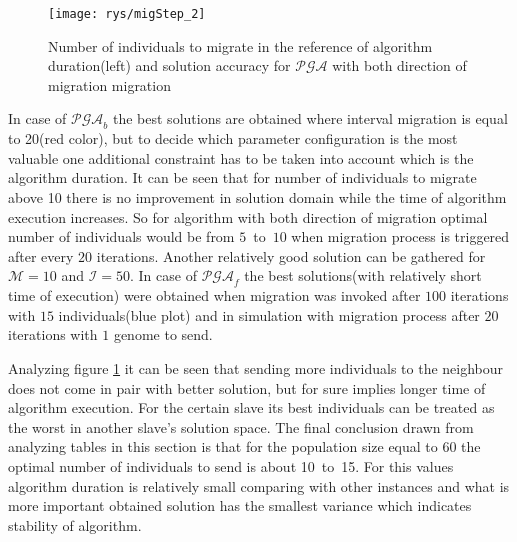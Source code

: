 	\begin{figure}[!htpb]
		\begin{center}
			\texttt{[image: rys/migStep\_2]}
		\end{center}
	\caption{Number of individuals to migrate in the reference of algorithm
	duration(left) and solution
	accuracy for $\mathcal{PGA}$ with both direction of migration migration}
		\label{fig:migNum2}
	\end{figure}

In case of $\mathcal{PGA}_b$ the best solutions
are obtained where interval migration is equal to 20(red color), but to
decide which parameter configuration is the most valuable one additional constraint
has to be taken into account which is the algorithm duration. It can be seen that
for number of individuals to migrate above 10 there is no improvement in
solution domain while the time of algorithm execution increases. So for
algorithm with both direction of migration optimal number of individuals would
be from $5$~to~$10$ when migration process is triggered after every $20$ iterations.
Another relatively good solution can be gathered for $\mathcal{M}=10$ and
$\mathcal{I}=50$. In case of $\mathcal{PGA}_f$ the best solutions(with
relatively short time of execution) were obtained when migration was invoked after $100$ iterations with
$15$ individuals(blue plot) and in simulation with migration process after $20$
iterations with $1$ genome to send.


Analyzing figure \ref{fig:migNum2} it can be seen that sending more
individuals to the neighbour does not come in pair with better solution, but for
sure implies longer time of algorithm execution. For the certain slave its best individuals
can be treated as the worst in another slave's solution space. The final
conclusion drawn from analyzing tables in this section is that for the
population size equal to 60 the optimal number of individuals to send is about
10~to~15. For this values algorithm duration is relatively small comparing with
other instances and what is more important obtained solution has the smallest
variance which indicates stability of algorithm.
